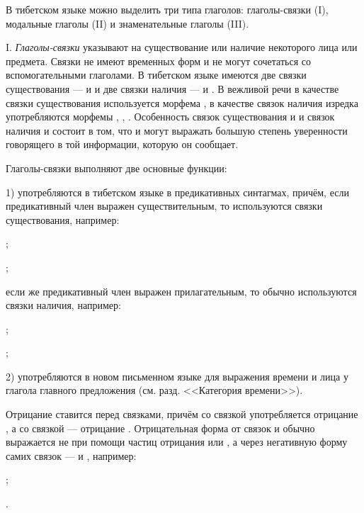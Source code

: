 В тибетском языке можно выделить три типа глаголов: глаголы-связки (I), модальные глаголы (II) и знаменательные глаголы (III).

I. \emph{Глаголы-связки} указывают на существование или наличие некоторого лица или предмета. Связки не имеют временных форм и не могут сочетаться со вспомогательными глаголами. В тибетском языке имеются две связки существования ---  и  и две связки наличия ---  и . В вежливой речи в качестве связки существования используется морфема , в качестве связок наличия изредка употребляются морфемы , , . Особенность связок существования  и  и связок наличия  и  состоит в том, что  и  могут выражать большую степень уверенности говорящего в той информации, которую он сообщает.

Глаголы-связки выполняют две основные функции:

1) употребляются в тибетском языке в предикативных синтагмах, причём, если предикативный член выражен существительным, то используются связки существования, например:
\begin{prfsample}
	\item {};
	\item {};
\end{prfsample}
если же предикативный член выражен прилагательным, то обычно используются связки наличия, например:
\begin{prfsample}
	\item {};
	\item {};
\end{prfsample}

2) употребляются в новом письменном языке для выражения времени и лица у глагола главного предложения (см. разд. <<Категория времени>>).

Отрицание ставится перед связками, причём со связкой  употребляется отрицание , а со связкой  --- отрицание . Отрицательная форма от связок  и  обычно выражается не при помощи частиц отрицания  или , а через негативную форму самих связок ---  и , например:
\begin{prfsample}
	\item {};
	\item {}.
\end{prfsample}


